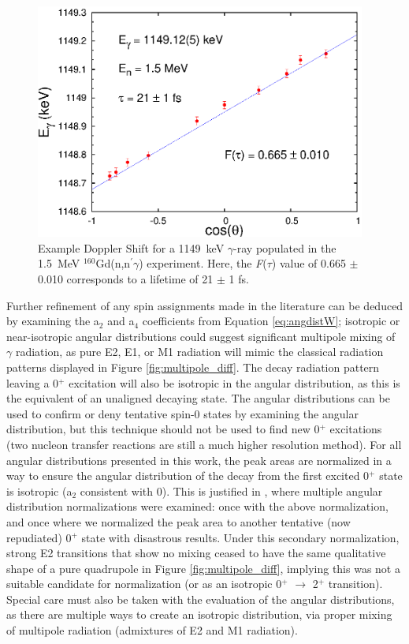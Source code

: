 \begin{figure}[ht]
\begin{center}
\includegraphics[width=0.97\textwidth]{DSAM_example.eps}
\caption{Example Doppler Shift for a 1149~keV $\gamma$-ray populated in the 1.5~MeV $^{160}$Gd(n,n$^\prime\gamma$) experiment. Here, the \textit{F}(\textit{$\tau$}) value of 0.665 $\pm$ 0.010 corresponds to a lifetime of 21 $\pm$ 1 fs.
\label{fig:DSAM_example}}
\end{center}
\end{figure}

Further refinement of any spin assignments made in the literature can be deduced by examining the a$_2$ and a$_4$ coefficients from Equation \ref{eq:angdistW}; isotropic or near-isotropic angular distributions could suggest significant multipole mixing of $\gamma$ radiation, as pure E2, E1, or M1 radiation will mimic the classical radiation patterns displayed in Figure \ref{fig:multipole_diff}. The decay radiation pattern leaving a 0$^+$ excitation will also be isotropic in the angular distribution, as this is the equivalent of an unaligned decaying state. The angular distributions can be used to confirm or deny tentative spin-0 states by examining the angular distribution, but this technique should not be used to find new 0$^+$ excitations (two nucleon transfer reactions are still a much higher resolution method). For all angular distributions presented in this work, the peak areas are normalized in a way to ensure the angular distribution of the decay from the first excited 0$^+$ state is isotropic (a$_2$ consistent with 0). This is justified in \cite{Lesher_160Gd0s}, where multiple angular distribution normalizations were examined: once with the above normalization, and once where we normalized the peak area to another tentative (now repudiated) 0$^+$ state with disastrous results. Under this secondary normalization, strong E2 transitions that show no mixing ceased to have the same qualitative shape of a pure quadrupole in Figure \ref{fig:multipole_diff}, implying this was not a suitable candidate for normalization (or as an isotropic 0$^+$ $\rightarrow$ 2$^+$ transition). Special care must also be taken with the evaluation of the angular distributions, as there are multiple ways to create an isotropic distribution, via proper mixing of multipole radiation (admixtures of E2 and M1 radiation).

